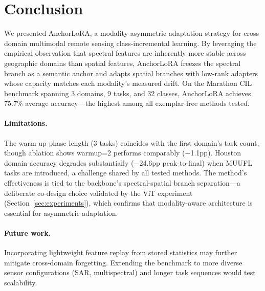 \section{Conclusion}
\label{sec:conclusion}

We presented AnchorLoRA, a modality-asymmetric adaptation strategy for cross-domain multimodal remote sensing class-incremental learning. By leveraging the empirical observation that spectral features are inherently more stable across geographic domains than spatial features, AnchorLoRA freezes the spectral branch as a semantic anchor and adapts spatial branches with low-rank adapters whose capacity matches each modality's measured drift. On the Marathon CIL benchmark spanning 3 domains, 9 tasks, and 32 classes, AnchorLoRA achieves 75.7\% average accuracy---the highest among all exemplar-free methods tested.

\paragraph{Limitations.}
The warm-up phase length (3 tasks) coincides with the first domain's task count, though ablation shows warmup=2 performs comparably ($-$1.1pp). Houston domain accuracy degrades substantially ($-$24.6pp peak-to-final) when MUUFL tasks are introduced, a challenge shared by all tested methods. The method's effectiveness is tied to the backbone's spectral-spatial branch separation---a deliberate co-design choice validated by the ViT experiment (Section~\ref{sec:experiments}), which confirms that modality-aware architecture is essential for asymmetric adaptation.

\paragraph{Future work.}
Incorporating lightweight feature replay from stored statistics may further mitigate cross-domain forgetting. Extending the benchmark to more diverse sensor configurations (SAR, multispectral) and longer task sequences would test scalability.
